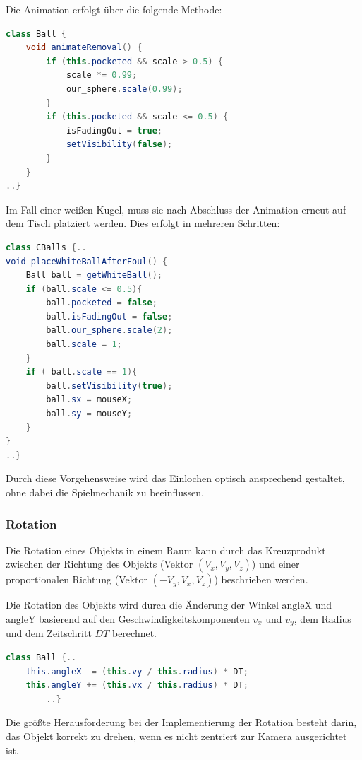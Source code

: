 \documentclass[a4paper,12pt]{article}
\begin{document}
\newpage
Die Animation erfolgt über die folgende Methode:  

\begin{lstlisting}[language=Java, frame=single]
	class Ball {	
	void animateRemoval() {
		if (this.pocketed && scale > 0.5) {
			scale *= 0.99;
			our_sphere.scale(0.99);      
		}
		if (this.pocketed && scale <= 0.5) {        
			isFadingOut = true;     
			setVisibility(false);     
		}
	}
..}
\end{lstlisting}

Im Fall einer weißen Kugel, muss sie nach Abschluss der Animation erneut auf dem Tisch platziert werden. Dies erfolgt in mehreren Schritten:

\newpage

\begin{lstlisting}[language=Java, frame=single]
class CBalls {..
void placeWhiteBallAfterFoul() {
	Ball ball = getWhiteBall();  
	if (ball.scale <= 0.5){          
		ball.pocketed = false;           
		ball.isFadingOut = false;
		ball.our_sphere.scale(2); 
		ball.scale = 1;
	} 
	if ( ball.scale == 1){
		ball.setVisibility(true);
		ball.sx = mouseX; 
		ball.sy = mouseY; 
	}
}
..}
\end{lstlisting}


Durch diese Vorgehensweise wird das Einlochen optisch ansprechend gestaltet, ohne dabei die Spielmechanik zu beeinflussen.

	
	
\subsubsection{Rotation}
Die Rotation eines Objekts in einem Raum kann durch das Kreuzprodukt zwischen der Richtung des Objekts (Vektor \((V_x, V_y, V_z)\)) und einer proportionalen Richtung (Vektor \((-V_y, V_x, V_z)\)) beschrieben werden.

Die Rotation des Objekts wird durch die Änderung der Winkel \( \text{angleX} \) und \( \text{angleY} \) basierend auf den Geschwindigkeitskomponenten \( v_x \) und \( v_y \), dem Radius und dem Zeitschritt \( DT \) berechnet.

\begin{lstlisting}[language=Java, columns=fixed, tabsize=2, xleftmargin=10pt, frame=single]  
	class Ball {..
	this.angleX -= (this.vy / this.radius) * DT;
	this.angleY += (this.vx / this.radius) * DT;
		..}
\end{lstlisting}  

Die größte Herausforderung bei der Implementierung der Rotation besteht darin, das Objekt korrekt zu drehen, wenn es nicht zentriert zur Kamera ausgerichtet ist. 
\end{document}
